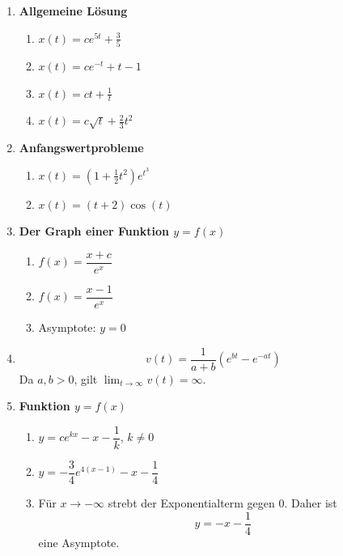 \begin{enumerate}
    \item \textbf{Allgemeine Lösung}
          \begin{enumerate}
              \item \(x(t)=ce^{5t}+\frac35\)
              \item \(x(t)=ce^{-t}+t-1\)
              \item \(x(t)=ct+\frac1t\)
              \item \(x(t)=c\sqrt{t}+\frac23t^2\)
          \end{enumerate}

    \item \textbf{Anfangswertprobleme}
          \begin{enumerate}
              \item \(x(t)=\left(1+\frac12t^2\right)e^{t^3}\)
              \item \(x(t)=(t+2)\cos(t)\)
          \end{enumerate}

    \item \textbf{Der Graph einer Funktion \(y=f(x)\)}
          \begin{enumerate}
              \item \(f(x)=\dfrac{x+c}{e^x}\)
              \item \(f(x)=\dfrac{x-1}{e^x}\)
              \item Asymptote: \(y=0\)
          \end{enumerate}

    \item \[
              v(t)=\frac{1}{a+b}\left(e^{bt}-e^{-at}\right)
          \]
          Da \(a,b>0\), gilt
          \(\displaystyle\lim_{t\to\infty}v(t)=\infty\).

    \item \textbf{Funktion \(y=f(x)\)}
          \begin{enumerate}
              \item \(y=ce^{kx}-x-\dfrac1k\), \(k\neq 0\)

              \item \(y=-\dfrac34e^{4(x-1)}-x-\dfrac14\)

              \item Für \(x\to-\infty\) strebt der
                    Exponentialterm gegen \(0\).
                    Daher ist
                    \[
                        y=-x-\frac14
                    \]
                    eine Asymptote.
          \end{enumerate}
\end{enumerate}
















